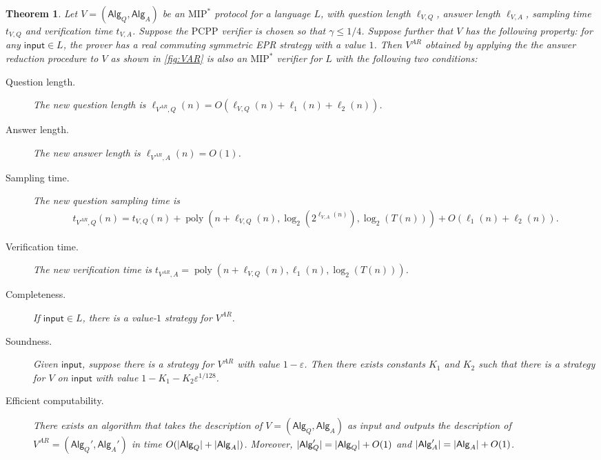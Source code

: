\documentclass[11pt]{article}
\theoremstyle{plain}
\newtheorem{theorem}{Theorem}[section]
\theoremstyle{definition}
\DeclarePairedDelimiter{\abs}{\lvert}{\rvert}
\newcommand{\poly} {\ensuremath{\operatorname{poly}}}
\newcommand{\ep} {\ensuremath{\varepsilon}}
\newcommand{\1}{\mathbb{1}} %
\newcommand{\PCPP}{\mathrm{PCPP}}
\newcommand{\ipt}{\mathsf{input}}
\newcommand{\Alg}{\mathsf{Alg}}
\newcommand{\MIP}{\mathrm{MIP}}
\begin{document}
\begin{theorem}
    \label{thm:answer_reduce}
	Let $V = (\Alg_Q, \Alg_A)$ be an $\MIP^\ast$ protocol for a language $L$,
    with question length $\ell_{V,Q}$, answer length $\ell_{V,A}$, sampling time $t_{V,Q}$
    and verification time $t_{V,A}$.
	Suppose the $\PCPP$ verifier is chosen so that $\gamma \leq 1/4$.
	Suppose further that $V$ has the following property: for any $\ipt \in L$, the prover has a 
	real commuting symmetric EPR strategy with a value $1$.
	Then $V^{AR}$ obtained by applying the the answer reduction procedure to $V$ as shown in \cref{fig:VAR} is also an
	$\MIP^\ast$ verifier for $L$ with the following two conditions:
	\begin{description}
        \item[Question length.] The new question length is $\ell_{V^{AR}, Q}(n) = O(\ell_{V,Q}(n) + \ell_1(n) + \ell_2(n))$.
        \item[Answer length.] The new answer length is $\ell_{V^{AR}, A}(n) = O(1)$.
        \item[Sampling time.] The new question sampling time is 
        \begin{align*}
            t_{V^{AR},Q}(n) = t_{V,Q}(n) + \poly(n+\ell_{V,Q}(n),\log_2(2^{\ell_{V,A}(n)}), \log_2(T(n))) + O(\ell_1(n) + \ell_2(n)).
        \end{align*}
        \item[Verification time.] The new verification time is $t_{V^{AR},A} = \poly(n+\ell_{V,Q}(n), \ell_1(n), \log_2(T(n)))$.
		\item[Completeness.] If $\ipt \in L$, there is a value-$1$ strategy for $V^{AR}$.
		\item[Soundness.] Given $\ipt$, suppose there is a strategy for $V^{AR}$ with value $1 - \ep$.
		Then there exists constants $K_1$ and $K_2$ such that there is a strategy for $V$ on $\ipt$ with
		value $1 - K_1 - K_2 \ep^{1/128}$.
        \item[Efficient computability.] There exists an algorithm that takes the description of $V = (\Alg_Q, \Alg_A)$ as input and outputs the description of $V^{AR} = (\Alg_Q', \Alg_A')$ in time $O( \abs{\Alg_Q}+ \abs{\Alg_A})$.
        Moreover, $\abs{\Alg_Q'} = \abs{\Alg_Q} +O(1)$ and $\abs{\Alg_A'} = \abs{\Alg_A}+O(1)$.
	\end{description}
\end{theorem}
\end{document}
